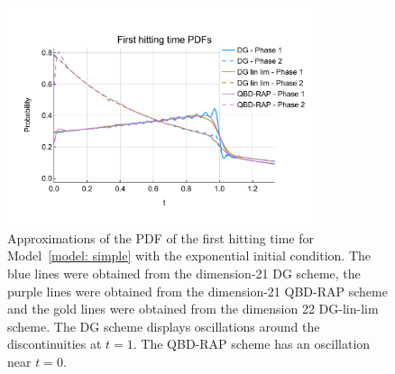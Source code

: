 \begin{figure}[h]
	\centering 
	\includegraphics[width=0.8\textwidth,trim={0cm 1.25cm 0cm 1.25cm},clip]{chapter6/figs/hitting_times_model/hitting_times/exp/pdf_order21.pdf}%
	\caption{Approximations of the PDF of the first hitting time for Model~\ref{model: simple} with the exponential initial condition. The blue lines were obtained from the dimension-21 DG scheme, the purple lines were obtained from the dimension-21 QBD-RAP scheme and the gold lines were obtained from the dimension 22 DG-lin-lim scheme. The DG scheme displays oscillations around the discontinuities at \(t=1\). The QBD-RAP scheme has an oscillation near \(t=0\). } 
	\label{fig: hitting time oscillation exp} 
\end{figure}
\exampleFloatBarrier
